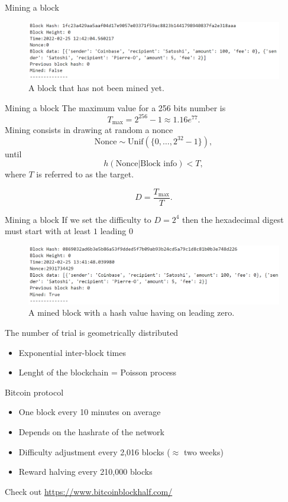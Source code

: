 \documentclass{beamer}
\begin{document}
\begin{frame}{Mining a block}
\begin{figure}[!ht]
    \includegraphics[width = \textwidth]{../../Figures/block_not_mined.png}
    \captionsetup{width=0.8\textwidth}
    \centering
    \caption{A block that has not been mined yet.}
    \label{fig:block_not_mined}
\end{figure}
\end{frame}
\begin{frame}{Mining a block}
The maximum value for a 256 bits number is
$$
T_\text{max} = 2^{256}-1 \approx 1.16e^{77}.
$$
Mining consists in drawing at random a nonce 
$$
\text{Nonce} \sim \text{Unif}(\{0,\ldots, 2^{32}-1\}),
$$
until 
$$
h(\text{Nonce}|\text{Block info})<T,
$$
where $T$ is referred to as the target.
\begin{tcolorbox}[enhanced,drop shadow, title=Difficulty of the cryptopuzzle]
$$
D = \frac{T_{\max}}{T}.
$$
\end{tcolorbox}

\end{frame}
\begin{frame}{Mining a block}
If we set the difficulty to $D = 2^4$ then the hexadecimal digest must start with at least $1$ leading $0$
\begin{figure}[!ht]
    \includegraphics[width = \textwidth]{../../Figures/block_mined.png}
    \captionsetup{width=0.8\textwidth}
    \centering
    \caption{A mined block with a hash value having on leading zero.}
    \label{fig:block_mined}
\end{figure}
The number of trial is geometrically distributed
\begin{itemize}
\item Exponential inter-block times
\item Lenght of the blockchain = Poisson process
\end{itemize}
\end{frame}
\begin{frame}{Bitcoin protocol}
\begin{itemize}
  \item One block every 10 minutes on average
  \item Depends on the hashrate of the network
  \item Difficulty adjustment every 2,016 blocks ($\approx$ two weeks)
  \item Reward halving every 210,000 blocks
\end{itemize}
Check out \url{https://www.bitcoinblockhalf.com/}
\end{frame}
\end{document}
